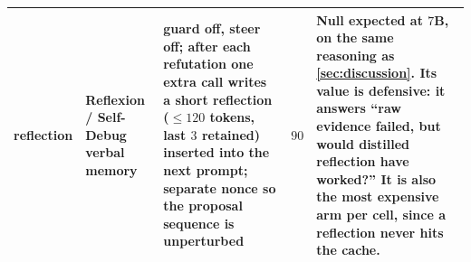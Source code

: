 \begin{table}[t]
\begin{tabular}{@{}L{1.6cm}L{2.5cm}L{5.0cm}L{1.5cm}L{4.4cm}@{}}
reflection &
Reflexion / Self-Debug verbal
memory~\cite{shinn2023reflexion,chen2024selfdebug} &
guard off, steer off; after each refutation one extra call writes a short
reflection (${\le}120$ tokens, last $3$ retained) inserted into the next
prompt; separate nonce so the proposal sequence is unperturbed &
$90$  &
Null expected at $7$B, on the same reasoning as \cref{sec:discussion}. Its
value is defensive: it answers ``raw evidence failed, but would distilled
reflection have worked?'' It is also the most expensive arm per cell, since a
reflection never hits the cache. \\

\bottomrule
\end{tabular}
\end{table}
